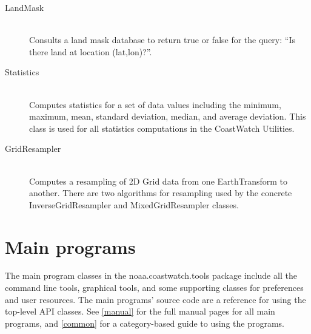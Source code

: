 \begin{description}
\item[{\java LandMask}]~\\ Consults a land mask database to
return true or false for the query: ``Is there land at location
(lat,lon)?''.

\item[{\java Statistics}]~\\ Computes statistics for a set of
data values including the minimum, maximum, mean, standard
deviation, median, and average deviation.  This class is used for
all statistics computations in the CoastWatch Utilities.

\item[{\java GridResampler}]~\\ Computes a resampling of 2D
{\java Grid} data from one {\java EarthTransform} to another.
There are two algorithms for resampling used by the concrete
{\java InverseGridResampler} and {\java MixedGridResampler}
classes.

\end{description}

\section{Main programs}

The main program classes in the {\java noaa.coastwatch.tools}
package include all the command line tools, graphical tools, and
some supporting classes for preferences and user resources.  The
main programs' source code are a reference for using the
top-level API classes. See \autoref{manual} for the full manual
pages for all main programs, and \autoref{common} for a
category-based guide to using the programs.
